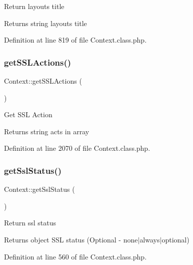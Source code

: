 Return layout\textquotesingle{}s title \begin{DoxyReturn}{Returns}
string layout\textquotesingle{}s title 
\end{DoxyReturn}


Definition at line 819 of file Context.\+class.\+php.

\mbox{\label{classContext_a10b68bdba6f55bc725c352aad7844dc7}} 
\subsubsection{\texorpdfstring{get\+S\+S\+L\+Actions()}{getSSLActions()}}
{\footnotesize\ttfamily Context\+::get\+S\+S\+L\+Actions (\begin{DoxyParamCaption}{ }\end{DoxyParamCaption})}

Get S\+SL Action

\begin{DoxyReturn}{Returns}
string acts in array 
\end{DoxyReturn}


Definition at line 2070 of file Context.\+class.\+php.

\mbox{\label{classContext_a284a60296c1f3df3adbe3395769fa883}} 
\subsubsection{\texorpdfstring{get\+Ssl\+Status()}{getSslStatus()}}
{\footnotesize\ttfamily Context\+::get\+Ssl\+Status (\begin{DoxyParamCaption}{ }\end{DoxyParamCaption})}

Return ssl status

\begin{DoxyReturn}{Returns}
object S\+SL status (Optional -\/ none$\vert$always$\vert$optional) 
\end{DoxyReturn}


Definition at line 560 of file Context.\+class.\+php.

\mbox{\label{classContext_aa60b75d32d4923bb3b9854985a82ce36}} 
